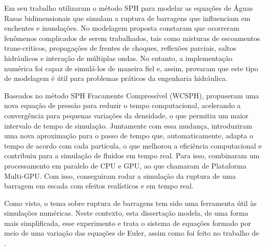 Em seu trabalho  utilizaram o método SPH para modelar as equações de Águas Rasas bidimensionais que simulam a ruptura de barragens que influenciam em enchentes e inundações. No modelagem proposta constaram que ocorreram fenômenos complicados de serem trabalhados, tais como misturas de escoamentos trans-críticos, propagações de frentes de choques, reflexões parciais, saltos hidráulicos e interação de múltiplas ondas. No entanto, a implementação numérica foi capaz de simulá-los de maneira fiel e, assim, provaram que este tipo de modelagem é útil para problemas práticos da engenharia hidráulica.

Baseados no método SPH Fracamente Compressível (WCSPH),  propuseram uma nova equação de pressão para reduzir o tempo computacional, acelerando a convergência para pequenas variações da densidade, o que permitiu um maior intervalo de tempo de simulação. Juntamente com essa mudança, introduziram uma nova aproximação para o passo de tempo que, automaticamente, adapta o tempo de acordo com cada partícula, o que melhorou a eficiência computacional e contribuiu para a simulação de fluidos em tempo real. Para isso, combinaram um processamento em paralelo de CPU e GPU, ao que chamaram de Plataforma Multi-GPU. Com isso, conseguiram rodar a simulação da ruptura de uma barragem em escada com efeitos realísticos e em tempo real.

Como visto, o tema sobre ruptura de barragens tem sido uma ferramenta útil às simulações numéricas. Neste contexto, esta dissertação modela, de uma forma mais simplificada, esse experimento e trata o sistema de equações formado por meio de uma variação das equações de Euler, assim como foi feito no trabalho de . 



       

    

         

                                
